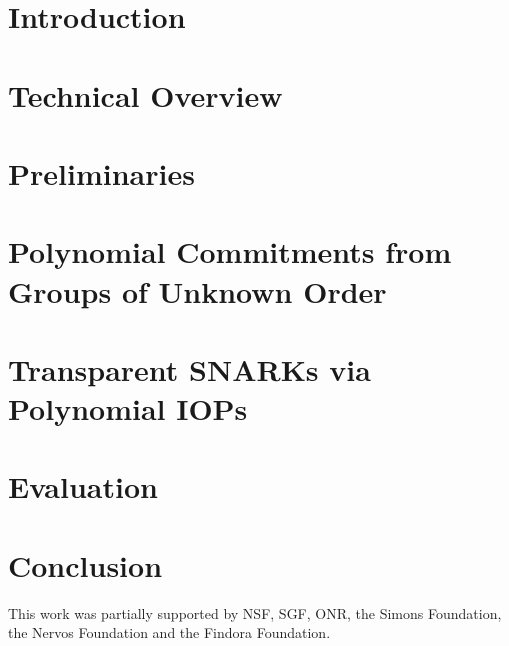 \documentclass[12pt]{article}
\theoremstyle{definition}
\begin{document}
\section{Introduction}
 
\section{Technical Overview}\label{sec:overview} 

\section{Preliminaries}


\section{Polynomial Commitments from Groups of Unknown Order}
\label{sec:protocol}


\section{Transparent SNARKs via Polynomial IOPs}\label{sec:polyiop}


\section{Evaluation}

\pagebreak
\section{Conclusion}

This work was partially supported by NSF, SGF, ONR, the Simons Foundation, the Nervos Foundation and the Findora Foundation. 

{\footnotesize
  }

\appendix

 
\end{document}
